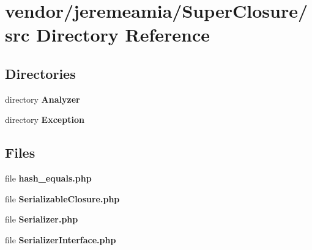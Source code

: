 \section{vendor/jeremeamia/\+Super\+Closure/src Directory Reference}
\label{dir_9e5255c0511437ff220a713300589b83}
\subsection*{Directories}
\begin{DoxyCompactItemize}
\item 
directory {\bf Analyzer}
\item 
directory {\bf Exception}
\end{DoxyCompactItemize}
\subsection*{Files}
\begin{DoxyCompactItemize}
\item 
file {\bf hash\+\_\+equals.\+php}
\item 
file {\bf Serializable\+Closure.\+php}
\item 
file {\bf Serializer.\+php}
\item 
file {\bf Serializer\+Interface.\+php}
\end{DoxyCompactItemize}
